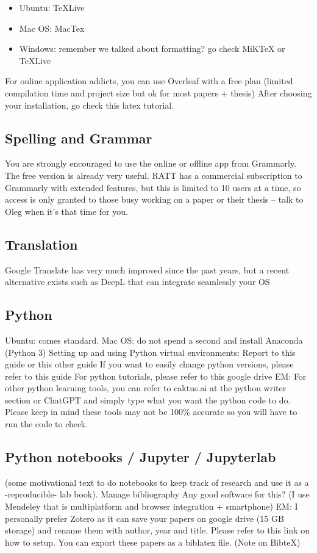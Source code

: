 \begin{itemize}
    \item Ubuntu: TeXLive
    \item Mac OS: MacTex
    \item Windows: remember we talked about formatting? go check MiKTeX or TeXLive
\end{itemize}
For online application addicts, you can use Overleaf with a free plan (limited compilation time and project size but ok for most papers + thesis)
After choosing your installation, go check this latex tutorial.

\subsection{Spelling and Grammar}
You are strongly encouraged to use the online or offline app from Grammarly. The free version is already very useful. RATT has a commercial subscription to Grammarly with extended features, but this is limited to 10 users at a time, so access is only granted to those busy working on a paper or their thesis -- talk to Oleg when
it’s that time for you.

\subsection{Translation}
Google Translate has very much improved since the past years, but a recent alternative exists such as DeepL that can integrate seamlessly your OS

\subsection{Python}
Ubuntu: comes standard.
Mac OS: do not spend a second and install Anaconda (Python 3)
Setting up and using Python virtual environments: 
Report to this guide or this other guide
If you want to easily change python versions, please refer to this guide 
For python tutorials, please refer to this google drive 
EM: For other python learning tools, you can refer to caktus.ai at the python writer section or ChatGPT and simply type what you want the python code to do. Please keep in mind these tools may not be 100\% accurate so you will have to run the code to check. 

\subsection{Python notebooks / Jupyter / Jupyterlab}
(some motivational text to do notebooks to keep track of research and use it as a -reproducible- lab book).
Manage bibliography
Any good software for this? (I use Mendeley that is multiplatform and browser integration + smartphone)
EM: I personally prefer Zotero as it can save your papers on google drive (15 GB storage) and rename them with author, year and title. Please refer to this link on how to setup. You can export these papers as a biblatex file. 
(Note on BibteX)

